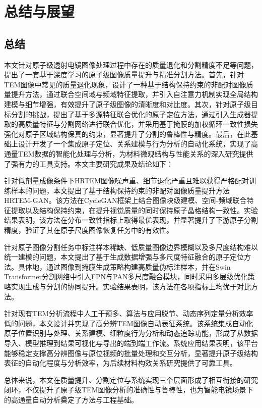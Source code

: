 \chapter{总结与展望}
\section{总结}
本文针对原子级透射电镜图像处理过程中存在的质量退化和分割精度不足等问题，提出了一套基于深度学习的原子级图像质量提升与精准分割方法。首先，针对TEM图像中常见的质量退化现象，设计了一种基于结构保持约束的非配对图像质量提升方法，通过联合空间域与频域特征提取，并引入自注意力机制实现全局结构建模与细节增强，有效提升了原子级图像的清晰度和对比度。其次，针对原子级目标分割的挑战，提出了基于多源特征联合优化的原子定位方法，通过引入生成器提取的高质量特征与分割网络进行联合优化，并采用基于掩膜的加权循环一致性损失强化对原子区域结构保真的约束，显著提升了分割的鲁棒性与精度。最后，在此基础上设计开发了一个集成原子定位、关系建模与行为分析的自动化系统，实现了高通量TEM数据的智能化处理与分析，为材料微观结构与性能关系的深入研究提供了强有力的工具支持。本文主要研究成果及结论如下：

针对低剂量成像条件下HRTEM图像噪声重、细节退化严重且难以获得严格配对训练样本的问题，本文提出了基于结构保持约束的非配对图像质量提升方法HRTEM-GAN。该方法在CycleGAN框架上结合图像块级建模、空间-频域联合特征提取以及结构保持约束，在提升视觉质量的同时保持原子晶格结构一致性。实验结果表明，该方法在分布一致性指标上取得最优表现，并显著提升了下游原子分割精度，验证了其在原子尺度图像恢复任务中的有效性。

针对原子图像分割任务中标注样本稀缺、低质量图像边界模糊以及多尺度结构难以统一建模的问题，本文提出了基于生成数据增强与多尺度特征融合的原子定位方法。具体地，通过图像到掩膜生成策略构建高质量伪标注样本，并在Swin Transformer分割网络中引入FPN与PAN多尺度融合模块，同时采用多层级优化策略实现生成与分割的协同提升。实验结果表明，该方法在各项指标上均优于对比方法。

针对现有TEM分析流程中人工干预多、算法与应用脱节、动态序列定量分析效率低的问题，本文设计并实现了高分辨TEM图像自动表征系统。该系统集成自动化原子位置识别与处理、关系建模、细粒度行为分析和动态追踪功能，形成了从数据导入、模型推理到结果可视化与导出的端到端工作流。系统应用结果表明，该平台能够稳定支撑高分辨图像与原位视频的批量处理和交互分析，显著提升原子级结构表征的自动化程度与分析效率，为后续材料构效关系研究提供了可靠工具。

总体来说，本文在质量提升、分割定位与系统实现三个层面形成了相互衔接的研究闭环，不仅提升了原子级TEM图像分析的准确性与鲁棒性，也为智能电镜场景下的高通量自动分析奠定了方法与工程基础。

